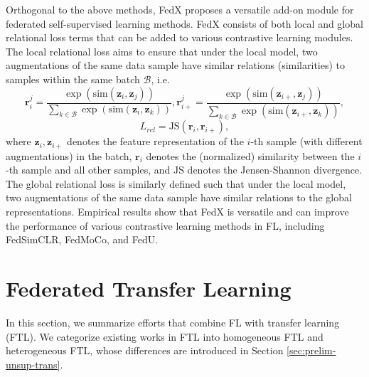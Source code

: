 \documentclass[11pt]{article}
\begin{document}
Orthogonal to the above methods, FedX \cite{han2022fedx} proposes a versatile add-on module for federated self-supervised learning methods. FedX consists of both local and global relational loss terms that can be added to various contrastive learning modules. The local relational loss aims to ensure that under the local model, two augmentations of the same data sample have similar relations (similarities) to samples within the same batch $\mathcal{B}$, i.e. 
\begin{equation}
        \mathbf{r}_i^j = \frac{\exp(\mathrm{sim}(\mathbf{z}_i, \mathbf{z}_j))}{\sum_{k\in\mathcal{B}}\exp(\mathrm{sim}(\mathbf{z}_i, \mathbf{z}_k))}, \mathbf{r}_{i+}^{j} = \frac{\exp(\mathrm{sim}(\mathbf{z}_{i+}, \mathbf{z}_j))}{\sum_{k\in\mathcal{B}}\exp(\mathrm{sim}(\mathbf{z}_{i+}, \mathbf{z}_k))}, 
\end{equation}
\begin{equation}
        L_{rel} = \mathrm{JS}(\mathbf{r}_i, \mathbf{r}_{i+}),
\end{equation}
where $\mathbf{z}_i, \mathbf{z}_{i+}$ denotes the feature representation of the $i$-th sample (with different augmentations) in the batch, $\mathbf{r}_i$ denotes the (normalized) similarity between the $i$-th sample and all other samples, and $\mathrm{JS}$ denotes the Jensen-Shannon divergence. The global relational loss is similarly defined such that under the local model, two augmentations of the same data sample have similar relations to the global representations. Empirical results show that FedX is versatile and can improve the performance of various contrastive learning methods in FL, including FedSimCLR, FedMoCo, and FedU.



\section{Federated Transfer Learning}
\label{sec:fed-utl}
In this section, we summarize efforts that combine FL with transfer learning (FTL). We categorize existing works in FTL into homogeneous FTL and heterogeneous FTL, whose differences are introduced in Section \ref{sec:prelim-unsup-trans}. 
\end{document}
